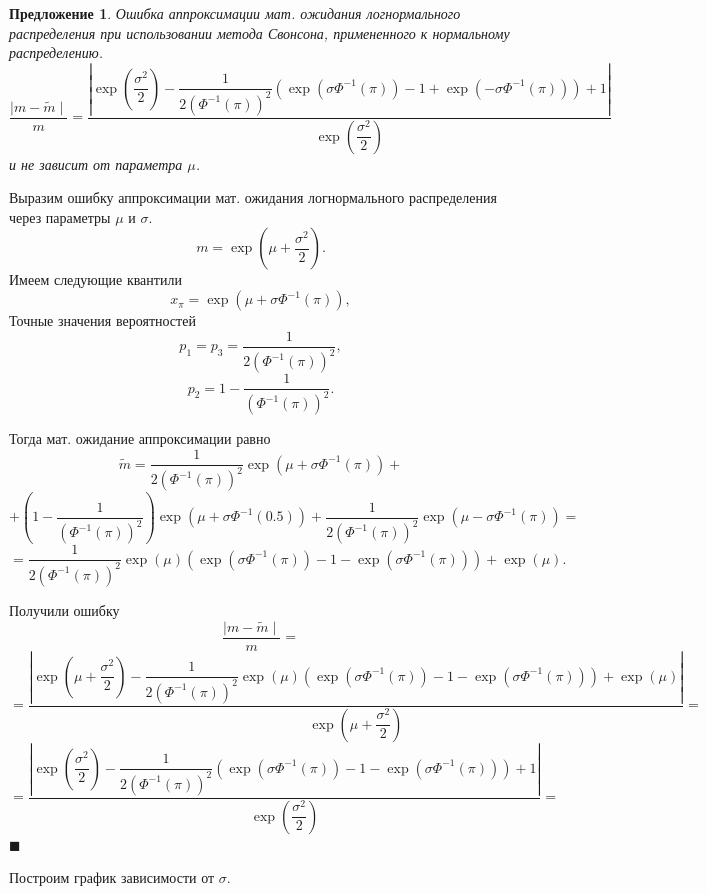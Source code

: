 \documentclass[12pt]{article}
\newtheorem{proposition}[theorem]{Предложение}
\newenvironment{Proof}{\par\noindent{\bf Доказательство.}}{\hfill$\scriptstyle\blacksquare$}
\begin{document}
	\begin{proposition}\label{pr5}
		Ошибка аппроксимации мат. ожидания логнормального распределения при использовании метода Свонсона, примененного к нормальному распределению.
		\[\dfrac{\mid m - \widetilde{m} \mid}{m}  = \dfrac{\left|\exp\left(\dfrac{\sigma^{2}}{2}\right) - \dfrac{1}{2(\Phi^{-1}(\pi))^{2}}\left(\exp(\sigma\Phi^{-1}(\pi))-1 +\exp(-\sigma\Phi^{-1}(\pi))\right) + 1\right|}{\exp\left(\dfrac{\sigma^{2}}{2}\right)}\]
		и не зависит от параметра $\mu$.
	\end{proposition}
	\begin{Proof}
		Выразим ошибку аппроксимации мат. ожидания логнормального распределения через параметры $\mu$ и $\sigma$.
		\[m = \exp\left(\mu+\dfrac{\sigma^{2}}{2}\right).\]
		Имеем следующие квантили
		\[x_{\pi} = \exp(\mu+\sigma\Phi^{-1}(\pi)),\]
		Точные значения вероятностей
		\[p_{1} = p_{3} = \dfrac{1}{2(\Phi^{-1}(\pi))^{2}},\]
		\[p_{2} = 1 - \dfrac{1}{(\Phi^{-1}(\pi))^{2}}.\]
		
		Тогда мат. ожидание аппроксимации равно
		\[\tilde{m} = \dfrac{1}{2(\Phi^{-1}(\pi))^{2}}\exp(\mu+\sigma\Phi^{-1}(\pi))+\]
		\[+\left(1 - \dfrac{1}{(\Phi^{-1}(\pi))^{2}}\right)\exp(\mu+\sigma\Phi^{-1}(0.5))+ \dfrac{1}{2(\Phi^{-1}(\pi))^{2}}\exp(\mu-\sigma\Phi^{-1}(\pi))=\]
		\[= \dfrac{1}{2(\Phi^{-1}(\pi))^{2}} \exp(\mu)(\exp(\sigma\Phi^{-1}(\pi))-1-\exp(\sigma\Phi^{-1}(\pi))) + \exp(\mu). \]
		
		Получили ошибку
		\[\dfrac{\mid m - \widetilde{m} \mid}{m} = \]\[=\dfrac{\left| \exp\left(\mu+\dfrac{\sigma^{2}}{2}\right) - \dfrac{1}{2(\Phi^{-1}(\pi))^{2}} \exp(\mu)(\exp(\sigma\Phi^{-1}(\pi))-1 -\exp(\sigma\Phi^{-1}(\pi))) + \exp(\mu) \right|}{\exp\left(\mu+\dfrac{\sigma^{2}}{2}\right)}=\]
		\[=\dfrac{\left| \exp\left(\dfrac{\sigma^{2}}{2}\right) - \dfrac{1}{2(\Phi^{-1}(\pi))^{2}} (\exp(\sigma\Phi^{-1}(\pi))-1 -\exp(\sigma\Phi^{-1}(\pi))) + 1 \right|}{\exp\left(\dfrac{\sigma^{2}}{2}\right)}=\]
	\end{Proof}
	
	Построим график зависимости от $\sigma$.
	
\end{document}
